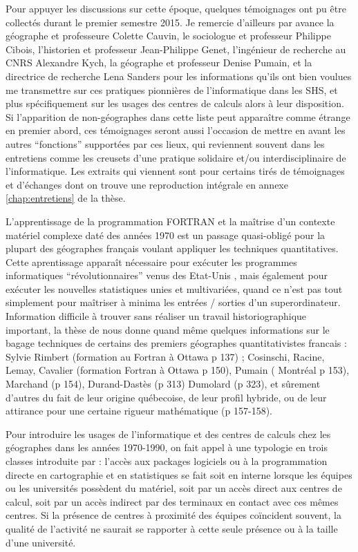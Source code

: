Pour appuyer les discussions sur cette époque, quelques témoignages ont pu être collectés durant le premier semestre 2015. Je remercie d'ailleurs par avance la géographe et professeure Colette Cauvin, le sociologue et professeur Philippe Cibois, l'historien et professeur Jean-Philippe Genet, l'ingénieur de recherche au CNRS Alexandre Kych, la géographe et professeur Denise Pumain, et la directrice de recherche Lena Sanders pour les informations qu'ils ont bien voulues me transmettre sur ces pratiques pionnières de l'informatique dans les SHS, et plus spécifiquement sur les usages des centres de calculs alors à leur disposition. Si l'apparition de non-géographes dans cette liste peut apparaître comme étrange en premier abord, ces témoignages seront aussi l'occasion de mettre en avant les autres \enquote{fonctions} supportées par ces lieux, qui reviennent souvent dans les entretiens comme les creusets d'une pratique solidaire et/ou interdisciplinaire de l'informatique. Les extraits qui viennent sont pour certains tirés de témoignages et d'échanges dont on trouve une reproduction intégrale en annexe \ref{chap:entretiens} de la thèse.

L'apprentissage de la programmation FORTRAN et la maîtrise d'un contexte matériel complexe daté des années 1970 est un passage quasi-obligé pour la plupart des géographes français voulant appliquer les techniques quantitatives. Cette aprentissage apparaît nécessaire pour exécuter les programmes informatiques \enquote{révolutionnaires} venus des Etat-Unis \autocite[150,127]{Cuyala2014}, mais également pour exécuter les nouvelles statistiques unies et multivariées, quand ce n’est pas tout simplement pour maîtriser à minima les entrées / sorties d’un superordinateur. Information difficile à trouver sans réaliser un travail historiographique important, la thèse de \textcite{Cuyala2014} nous donne quand même quelques informations sur le bagage techniques de certains des premiers géographes quantitativistes francais : Sylvie Rimbert (formation au Fortran à Ottawa p 137) ;  Cosinschi, Racine, Lemay, Cavalier (formation Fortran à Ottawa p 150), Pumain ( Montréal p 153), Marchand (p 154), Durand-Dastès (p 313) Dumolard (p 323), et sûrement d’autres du fait de leur origine québecoise, de leur profil hybride, ou de leur attirance pour une certaine rigueur mathématique (p 157-158).

Pour introduire les usages de l'informatique et des centres de calculs chez les géographes dans les années 1970-1990, on fait appel à une typologie en trois classes introduite par \textcites{Wieber1980}[448]{Joliveau2004} : l’accès aux packages logiciels ou à la programmation directe en cartographie et en statistiques se fait soit en interne lorsque les équipes ou les universités possèdent du matériel, soit par un accès direct aux centres de calcul, soit par un accès indirect par des terminaux en contact avec ces mêmes centres. Si la présence de centres à proximité des équipes coïncident souvent, la qualité de l'activité ne saurait se rapporter à cette seule présence ou à la taille d'une université.

